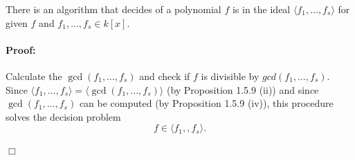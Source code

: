 \clearpage
\begin{corollary}[title = Corollary 1.5.10]
    There is an algorithm that decides of a polynomial $f$ is in the ideal $\langle f_1, \ldots, f_s \rangle$ for given $f$ and $f_1, \ldots, f_s \in k[x]$.

    \paragraph{Proof:} Calculate the $\gcd(f_1, \ldots, f_s)$ and check if $f$ is divisible by $gcd(f_1, \ldots, f_s)$. Since $\langle f_1, \ldots, f_s \rangle = \langle \gcd(f_1, \ldots, f_s) \rangle$ 
    (by Proposition 1.5.9 (ii)) and since $\gcd(f_1, \ldots, f_s)$ can be computed (by Proposition 1.5.9 (iv)), this procedure solves the decision problem \[f \in \langle f_1, , f_s \rangle.\]

      \begin{flushright}
        $\Box $
      \end{flushright}
\end{corollary}

